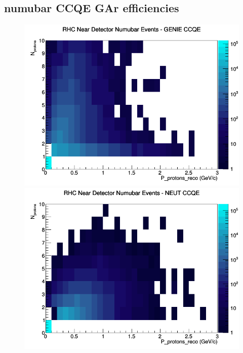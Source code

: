 \documentclass[12pt]{article}
\begin{document}
\subsection{numubar CCQE GAr efficiencies}
\begin{figure}[h]
\includegraphics[width=\linewidth]{eff_N_P/GAr/protons/CCQE_RHC_ND_numubar_N_P_GENIE.png}
\endminipage
{}
\includegraphics[width=\linewidth]{eff_N_P/GAr/protons/CCQE_RHC_ND_numubar_N_P_NEUT.png}
\endminipage
{}

\end{figure}
\end{document}
